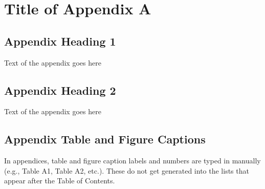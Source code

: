\section{Title of Appendix A}

\subsection{Appendix Heading 1}
\noindent Text of the appendix goes here

\subsection{Appendix Heading 2}
\noindent Text of the appendix goes here 

\subsection{Appendix Table and Figure Captions}
\noindent In appendices, table and figure caption labels and numbers are typed in manually (e.g., Table A1, Table A2, etc.). These do not get generated into the lists that appear after the Table of Contents. 